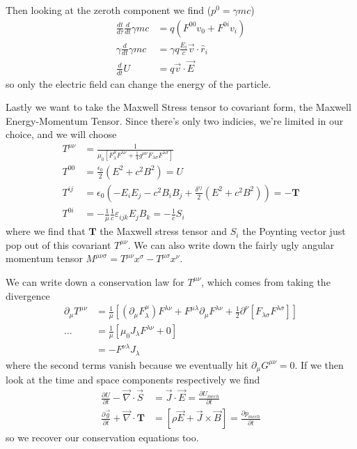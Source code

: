 \documentclass[10pt]{report}
\newcommand{\rd}[2]{\frac{d#1}{d#2}}
\newcommand{\pd}[2]{\frac{\partial #1}{\partial#2}}
\begin{document}
Then looking at the zeroth component we find ($p^0 = \gamma mc$)
\begin{align}
    \rd{t}{\tau}\rd{}{t}\gamma mc &= q\left( F^{00}v_0 + F^{0i}v_i \right)\\
    \gamma \rd{}{t}\gamma mc &= \gamma q \frac{E_i}{c} \vec{v} \cdot \hat{r}_i\\
    \rd{}{t}U &= q\vec{v} \cdot \vec{E}
\end{align}
so only the electric field can change the energy of the particle.

Lastly we want to take the Maxwell Stress tensor to covariant form, the Maxwell Energy-Momentum Tensor. Since there's only two indicies, we're limited in our choice, and we will choose
\begin{align}
    T^{\mu \nu} &= \frac{1}{\mu_0\left[ F^\mu_\lambda F^{\lambda \nu} + \frac{1}{4}g^{\mu \nu}F_{\lambda \sigma}F^{\lambda \sigma} \right]}\\
    T^{00} &= \frac{\epsilon_0}{2}\left( E^2 + c^2B^2 \right) = U\\
    T^{ij} &= \epsilon_0 \left( -E_iE_j - c^2B_iB_j + \frac{\delta^{ij}}{2}\left( E^2 + c^2B^2 \right) \right) = -\mathbf{T}\\
    T^{0i} &= -\frac{1}{\mu}\frac{1}{c}\varepsilon_{ijk}E_jB_k = -\frac{1}{c}S_i
\end{align}
where we find that $\mathbf{T}$ the Maxwell stress tensor and $S_i$ the Poynting vector just pop out of this covariant $T^{\mu \nu}$. We can also write down the fairly ugly angular momentum tensor $M^{\mu \nu \sigma} = T^{\mu \nu}x^\sigma - T^{\mu \sigma}x^\nu$.

We can write down a conservation law for $T^{\mu \nu}$, which comes from taking the divergence 
\begin{align}
    \partial_\mu T^{\mu \nu} &= \frac{1}{\mu}\left[ \left( \partial_\mu F^\mu_\lambda \right)F^{\lambda \nu} + F^{\mu \lambda}\partial_\mu F^{\lambda \nu} + \frac{1}{2}\partial^\nu\left[ F_{\lambda \sigma}F^{\lambda \sigma} \right] \right]\\
    \dots &= \frac{1}{\mu}\left[ \mu_0 J_\lambda F^{\lambda \nu} + 0 \right]\\
    &= -F^{\nu \lambda}J_\lambda
\end{align}
where the second terms vanish because we eventually hit $\partial_\mu G^{\mu \nu} = 0$. If we then look at the time and space components respectively we find
\begin{align}
    \pd{U}{t} - \vec{\nabla} \cdot \vec{S} &= \vec{J} \cdot \vec{E} = \pd{U_{mech}}{t}\\
    \pd{\vec{g}}{t} + \vec{\nabla} \cdot \mathbf{T} &= \left[ \rho \vec{E} + \vec{J} \times \vec{B} \right] = \pd{p_{mech}}{t}
\end{align}
so we recover our conservation equations too. 
\end{document}
